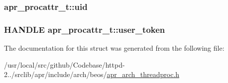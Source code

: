 \subsubsection[{\texorpdfstring{uid}{uid}}]{ apr\+\_\+procattr\+\_\+t\+::uid}\hypertarget{structapr__procattr__t_aab58995d64f21273fd92b102a38ca05f}{}\label{structapr__procattr__t_aab58995d64f21273fd92b102a38ca05f}
\subsubsection[{\texorpdfstring{user\+\_\+token}{user_token}}]{\setlength{\rightskip}{0pt plus 5cm}H\+A\+N\+D\+LE apr\+\_\+procattr\+\_\+t\+::user\+\_\+token}\hypertarget{structapr__procattr__t_a5c318dfdfa4357ca018ff85293296240}{}\label{structapr__procattr__t_a5c318dfdfa4357ca018ff85293296240}


The documentation for this struct was generated from the following file\+:\begin{DoxyCompactItemize}
\item 
/usr/local/src/github/\+Codebase/httpd-\/2../srclib/apr/include/arch/beos/\hyperlink{beos_2apr__arch__threadproc_8h}{apr\+\_\+arch\+\_\+threadproc.\+h}\end{DoxyCompactItemize}
